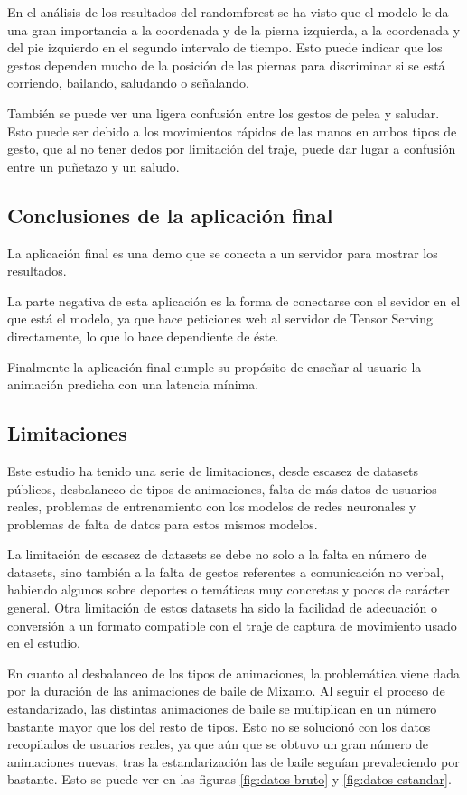 En el análisis de los resultados del \gls{randomforest} se ha visto que el modelo le da una gran importancia a la coordenada y de la pierna izquierda, a la coordenada y del pie izquierdo en el segundo intervalo de tiempo. Esto puede indicar que los gestos dependen mucho de la posición de las piernas para discriminar si se está corriendo, bailando, saludando o señalando.

También se puede ver una ligera confusión entre los gestos de pelea y saludar. Esto puede ser debido a los movimientos rápidos de las manos en ambos tipos de gesto, que al no tener dedos por limitación del traje, puede dar lugar a confusión entre un puñetazo y un saludo.

\subsection{Conclusiones de la aplicación final}
La aplicación final es una demo que se conecta a un servidor para mostrar los resultados.

La parte negativa de esta aplicación es la forma de conectarse con el sevidor en el que está el modelo, ya que hace peticiones web al servidor de Tensor Serving directamente, lo que lo hace dependiente de éste.

Finalmente la aplicación final cumple su propósito de enseñar al usuario la animación predicha con una latencia mínima.


\subsection{Limitaciones}

Este estudio ha tenido una serie de limitaciones, desde escasez de datasets públicos, desbalanceo de tipos de animaciones, falta de más datos de usuarios reales, problemas de entrenamiento con los modelos de redes neuronales y problemas de falta de datos para estos mismos modelos.

La limitación de escasez de datasets se debe no solo a la falta en número de datasets, sino también a la falta de gestos referentes a comunicación no verbal, habiendo algunos sobre deportes o temáticas muy concretas y pocos de carácter general.  Otra limitación de estos datasets ha sido la facilidad de adecuación o conversión a un formato compatible con el traje de captura de movimiento usado en el estudio.

En cuanto al desbalanceo de los tipos de animaciones, la problemática viene dada por la duración de las animaciones de baile de Mixamo. Al seguir el proceso de estandarizado, las distintas animaciones de baile se multiplican en un número bastante mayor que los del resto de tipos. Esto no se solucionó con los datos recopilados de usuarios reales, ya que aún que se obtuvo un gran número de animaciones nuevas, tras la estandarización las de baile seguían prevaleciendo por bastante. Esto se puede ver en las figuras \ref{fig:datos-bruto} y \ref{fig:datos-estandar}.

